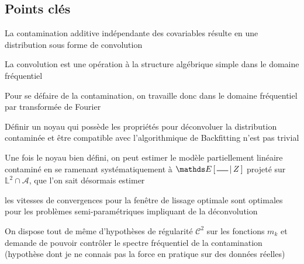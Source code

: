
\subsection{Points clés}

\begin{todolist}
    \item La contamination additive indépendante des covariables résulte en une distribution sous forme de convolution
    \item La convolution est une opération à la structure algébrique simple dans le domaine fréquentiel
    \item[\checked] Pour se défaire de la contamination, on travaille donc dans le domaine fréquentiel par transformée de Fourier
    \item Définir un noyau qui possède les propriétés pour déconvoluer la distribution contaminée et être compatible avec l'algorithmique de Backfitting n'est pas trivial
    \item Une fois le noyau bien défini, on peut estimer le modèle partiellement linéaire contaminé en se ramenant systématiquement à $\esperancesachant Z \dash$ projeté sur $\mathds L^2 \cap \mathcal A$, que l'on sait désormais estimer 
    \item[\checked] les vitesses de convergences pour la fenêtre de lissage optimale sont optimales pour les problèmes semi-paramétriques impliquant de la déconvolution
    \item[\crossed] On dispose tout de même d'hypothèses de régularité $\mathcal C^2$ sur les fonctions $m_k$ et demande de pouvoir contrôler le spectre fréquentiel de la contamination (hypothèse dont je ne connais pas la force en pratique sur des données réelles) 
\end{todolist}